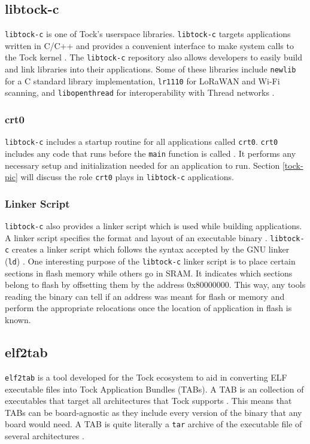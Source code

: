 \documentclass[12pt]{ucsddissertation}
\begin{document}
\subsection{libtock-c} \label{libtock-bg}
\texttt{libtock-c} is one of Tock's userspace libraries. \texttt{libtock-c} targets applications written in  C/C++ and provides a convenient interface to make system calls to the Tock kernel \cite{libtock-c}. The \texttt{libtock-c} repository also allows developers to easily build and link libraries into their applications. Some of these libraries include \texttt{newlib} for a C standard library implementation, \texttt{lr1110} for LoRaWAN and Wi-Fi scanning, and \texttt{libopenthread} for interoperability with Thread networks \cite{libtock-c}. 

\subsubsection{crt0}
\texttt{libtock-c} includes a startup routine for all applications called \texttt{crt0}. \texttt{crt0} includes any code that runs before the \texttt{main} function is called \cite{crt0}. It performs any necessary setup and initialization needed for an application to run. Section \ref{tock-pic} will discuss the role \texttt{crt0} plays in \texttt{libtock-c} applications.

\subsubsection{Linker Script}
\texttt{libtock-c} also provides a linker script which is used while building applications. A linker script specifies the format and layout of an executable binary \cite{osdev-linker-script}. \texttt{libtock-c} creates a linker script which follows the syntax accepted by the GNU linker (\texttt{ld}) \cite{linker-script}. One interesting purpose of the \texttt{libtock-c} linker script is to place certain sections in flash memory while others go in SRAM. It indicates which sections belong to flash by offsetting them by the address 0x80000000. This way, any tools reading the binary can tell if an address was meant for flash or memory and perform the appropriate relocations once the location of application in flash is known.

\subsection{elf2tab} \label{elf2tab-bg}
\texttt{elf2tab} is a tool developed for the Tock ecosystem to aid in converting ELF executable files into Tock Application Bundles (TABs). A TAB is an collection of executables that target all architectures that Tock supports \cite{tock-compilation}. This means that TABs can be board-agnostic as they include every version of the binary that any board would need. A TAB is quite literally a \texttt{tar} archive of the executable file of several architectures \cite{tar}.
\end{document}
